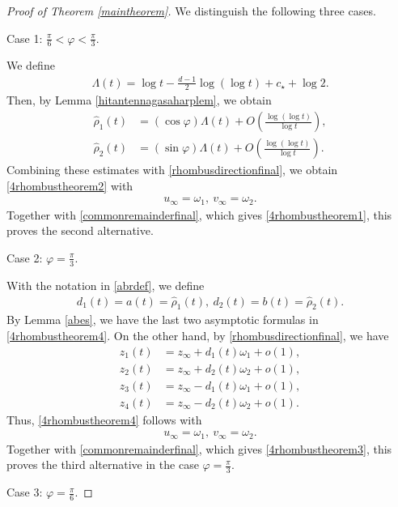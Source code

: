 \documentclass[reqno]{amsart}
\theoremstyle{plain}
\theoremstyle{definition}
\numberwithin{equation}{section}
\begin{document}
\begin{proof}[Proof of Theorem \ref{maintheorem}]
We distinguish the following three cases.


Case 1: $\frac{\pi}{6}<\varphi<\frac{\pi}{3}$.

We define 
\begin{align*}
\Lambda(t)=\log{t}-\frac{d-1}{2}\log{(\log{t})}+c_{\star}+\log{2}.
\end{align*}
Then, by Lemma \ref{hitantennagasaharplem}, we obtain
\begin{align*}
\hat{\rho}_1(t)&=\left(\cos\varphi\right)\Lambda(t)+O\left(\frac{\log(\log t)}{\log t}\right),
\\
\hat{\rho}_2(t)&=\left(\sin\varphi\right)\Lambda(t)+O\left(\frac{\log(\log t)}{\log t}\right).
\end{align*}
Combining these estimates with \eqref{rhombusdirectionfinal}, we obtain \eqref{4rhombustheorem2} with
\begin{align*}
u_{\infty}=\omega_1,\ v_{\infty}=\omega_2.
\end{align*}
Together with \eqref{commonremainderfinal}, which gives \eqref{4rhombustheorem1}, this proves the second alternative.


Case 2: $\varphi=\frac{\pi}{3}$.

With the notation in \eqref{abrdef}, we define
\begin{align*}
d_1(t)=a(t)=\hat{\rho}_1(t),\ d_2(t)=b(t)=\hat{\rho}_2(t).
\end{align*}
By Lemma \ref{abes}, we have the last two asymptotic formulas in \eqref{4rhombustheorem4}. On the other hand,
by \eqref{rhombusdirectionfinal}, we have
\begin{align*}
z_1(t)&=z_{\infty}+d_1(t)\omega_1+o(1),
\\
 z_2(t)&=z_{\infty}+d_2(t)\omega_2+o(1),
\\
z_3(t)&=z_{\infty}-d_1(t)\omega_1+o(1),
\\
z_4(t)&=z_{\infty}-d_2(t)\omega_2+o(1).
\end{align*}
Thus, \eqref{4rhombustheorem4} follows with
\begin{align*}
u_{\infty}=\omega_1,\ v_{\infty}=\omega_2.
\end{align*}
Together with \eqref{commonremainderfinal}, which gives \eqref{4rhombustheorem3}, this proves the third alternative in the
case $\varphi=\frac{\pi}{3}$.

Case 3: $\varphi=\frac{\pi}{6}$.



\end{proof}
\end{document}
